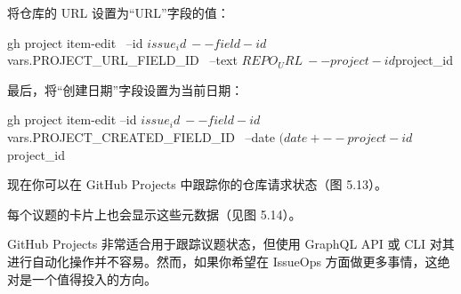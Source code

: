 将仓库的 URL 设置为“URL”字段的值：

\begin{shell}
gh project item-edit \
  --id $issue_id \
  --field-id ${{ vars.PROJECT_URL_FIELD_ID }} \
  --text $REPO_URL \
  --project-id $project_id
\end{shell}

最后，将“创建日期”字段设置为当前日期：

\begin{shell}
gh project item-edit --id $issue_id \
  --field-id ${{ vars.PROJECT_CREATED_FIELD_ID }} \
  --date $(date +%
  --project-id $project_id
\end{shell}

现在你可以在 GitHub Projects 中跟踪你的仓库请求状态（图 5.13）。


每个议题的卡片上也会显示这些元数据（见图 5.14）。


GitHub Projects 非常适合用于跟踪议题状态，但使用 GraphQL API 或 CLI 对其进行自动化操作并不容易。然而，如果你希望在 IssueOps 方面做更多事情，这绝对是一个值得投入的方向。































